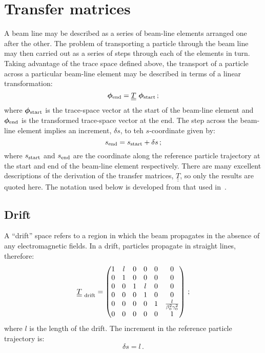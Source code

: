 \graphicspath{ {04-TransferMatrices/Figures/} }

\section{Transfer matrices}

A beam line may be described as a series of beam-line elements
arranged one after the other.
The problem of transporting a particle through the beam line may then
carried out as a series of steps through each of the elements in turn.
Taking advantage of the trace space defined above, the transport of
a particle across a particular beam-line element may be described in
terms of a linear transformation:
\begin{equation}
  \bm{\phi}_{\rm end} = \underline{\underline{T}} ~ \bm{\phi}_{\rm start} \, ;
\end{equation}
where $\bm{\phi}_{\rm start}$ is the trace-space vector at the start
of the beam-line element and $\bm{\phi}_{\rm end}$ is the transformed
trace-space vector at the end.
The step across the beam-line element implies an increment, $\delta s$,
to teh $s$-coordinate given by:
\begin{equation}
  s_{\rm end} = s_{\rm start} + \delta s \, ;
\end{equation}
where $s_{\rm start}$ and $s_{\rm end}$ are the coordinate along the
reference particle trajectory at the start and end of the beam-line
element respectively.
There are many excellent descriptions of the derivation of the
transfer matrices, $\underline{\underline{T}}$, so only the results
are quoted here.
The notation used below is developed from that used
in~\cite{Wolski:2014}.

\subsection{Drift}

A ``drift'' space refers to a region in which the beam propagates in
the absence of any electromagnetic fields.
In a drift, particles propagate in straight lines, therefore:
\begin{equation}
  \underline{\underline{T}}_{\rm~drift} =
        \begin{pmatrix}
          1 & l & 0 & 0 & 0 &                             0 \\
          0 & 1 & 0 & 0 & 0 &                             0 \\
          0 & 0 & 1 & l & 0 &                             0 \\
          0 & 0 & 0 & 1 & 0 &                             0 \\
          0 & 0 & 0 & 0 & 1 & \frac{l}{\beta_0^2 \gamma_0^2} \\
          0 & 0 & 0 & 0 & 0 &                             1
        \end{pmatrix} \, ; 
\end{equation}
where $l$ is the length of the drift.
The increment in the reference particle trajectory is:
\begin{equation}
  \delta s = l \, .
\end{equation}

